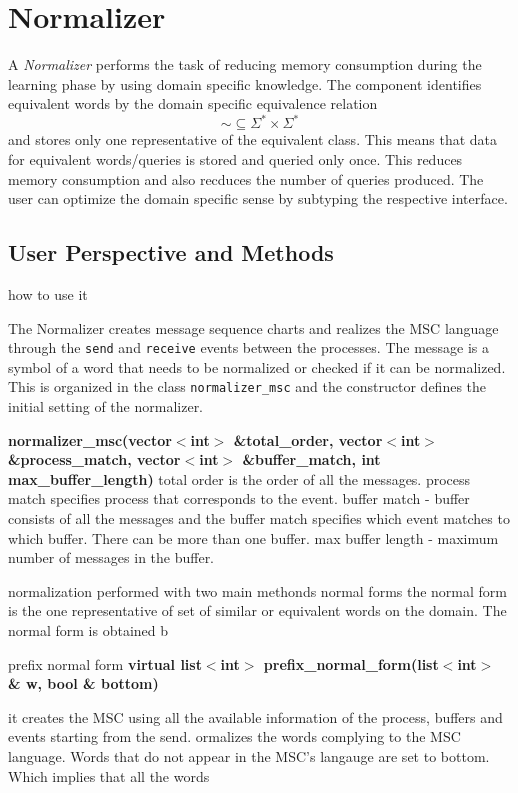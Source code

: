 \section{Normalizer}

A \emph{Normalizer} performs the task of reducing memory consumption during the learning phase by using domain specific knowledge.
The component identifies equivalent words by the domain specific equivalence relation 
\[ 
  \sim \subseteq \Sigma ^{\ast} \times \Sigma ^{\ast}
\]
and stores only one representative of the equivalent class. This means that data for equivalent words/queries is stored and queried only once. This reduces memory consumption and also recduces the number of queries produced. The user can optimize the domain specific sense by subtyping the respective interface.

\subsection{User Perspective and Methods}
how to use it

The Normalizer creates message sequence charts and realizes the MSC language through the \texttt{send} and \texttt{receive} events between the processes. The message is a symbol of a word that needs to be normalized or checked if it can be normalized. 
This is organized in the class \texttt{normalizer\_msc} and the constructor defines the initial setting of the normalizer.

\textbf{normalizer\_msc(vector$<$int$>$ \&total\_order, vector$<$int$>$ \&process\_match, vector$<$int$>$ \&buffer\_match, int max\_buffer\_length)}
total order is the order of all the messages.
process match specifies process that corresponds to the event. 
buffer match -  buffer consists of all the messages and the buffer match specifies which event matches to which buffer. There can be more than one buffer. 
max buffer length - maximum number of messages in the buffer. 

normalization performed with two main methonds
normal forms
the normal form is the one representative of set of similar or equivalent words on the domain. The normal form is obtained b 

prefix normal form 
\textbf{virtual list$<$int$>$ prefix\_normal\_form(list$<$int$>$ \& w, bool \& bottom)}

it creates the MSC using all the available information of the process, buffers and events starting from the send. ormalizes the words complying to the MSC language. Words that do not appear in the MSC's langauge are set to bottom. Which implies that all the words 


